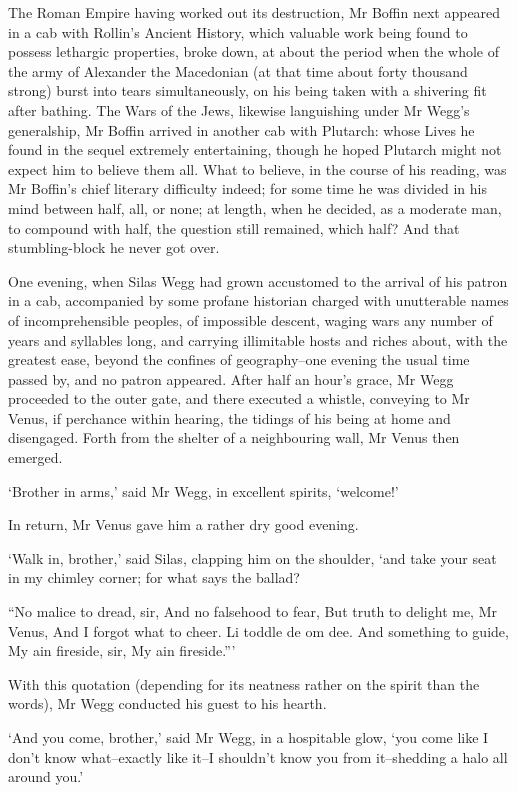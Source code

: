 The Roman Empire having worked out its destruction, Mr Boffin next
appeared in a cab with Rollin’s Ancient History, which valuable work
being found to possess lethargic properties, broke down, at about the
period when the whole of the army of Alexander the Macedonian (at that
time about forty thousand strong) burst into tears simultaneously, on
his being taken with a shivering fit after bathing. The Wars of the
Jews, likewise languishing under Mr Wegg’s generalship, Mr Boffin
arrived in another cab with Plutarch: whose Lives he found in the sequel
extremely entertaining, though he hoped Plutarch might not expect him to
believe them all. What to believe, in the course of his reading, was Mr
Boffin’s chief literary difficulty indeed; for some time he was divided
in his mind between half, all, or none; at length, when he decided, as a
moderate man, to compound with half, the question still remained, which
half? And that stumbling-block he never got over.

One evening, when Silas Wegg had grown accustomed to the arrival of
his patron in a cab, accompanied by some profane historian charged with
unutterable names of incomprehensible peoples, of impossible descent,
waging wars any number of years and syllables long, and carrying
illimitable hosts and riches about, with the greatest ease, beyond the
confines of geography--one evening the usual time passed by, and no
patron appeared. After half an hour’s grace, Mr Wegg proceeded to the
outer gate, and there executed a whistle, conveying to Mr Venus,
if perchance within hearing, the tidings of his being at home and
disengaged. Forth from the shelter of a neighbouring wall, Mr Venus then
emerged.

‘Brother in arms,’ said Mr Wegg, in excellent spirits, ‘welcome!’

In return, Mr Venus gave him a rather dry good evening.

‘Walk in, brother,’ said Silas, clapping him on the shoulder, ‘and take
your seat in my chimley corner; for what says the ballad?

     “No malice to dread, sir,
     And no falsehood to fear,
     But truth to delight me, Mr Venus,
     And I forgot what to cheer.
     Li toddle de om dee.
     And something to guide,
     My ain fireside, sir,
     My ain fireside.”’

With this quotation (depending for its neatness rather on the spirit
than the words), Mr Wegg conducted his guest to his hearth.

‘And you come, brother,’ said Mr Wegg, in a hospitable glow, ‘you come
like I don’t know what--exactly like it--I shouldn’t know you from
it--shedding a halo all around you.’

